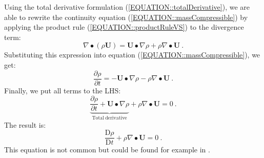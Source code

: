	Using the total derivative formulation (\ref{EQUATION::totalDerivative}),
    we are able to rewrite the continuity equation
    (\ref{EQUATION::massCompressible}) by applying the product rule
    (\ref{EQUATION::productRuleVS}) to the divergence term:
%
%
\begin{equation}
  \nabla \bullet \left(\rho \textbf{U}\right)
=
  \textbf{U} \bullet \nabla \rho + \rho \nabla \bullet \textbf{U} ~.
\end{equation}
%
%
	Substituting this expression into equation
    (\ref{EQUATION::massCompressible}), we get:
%
%
\begin{equation}
 \frac{\partial \rho}{\partial t}
 =
 -\textbf{U} \bullet \nabla \rho - \rho \nabla \bullet \textbf{U} ~.
\end{equation}
%
%
	Finally, we put all terms to the LHS:
%
%
\begin{equation}
 \underbrace{\frac{\partial \rho}{\partial t}
+
 \textbf{U} \bullet \nabla \rho}_{\mathrm{Total~derivative}}
+
 \rho \nabla \bullet \textbf{U}
 =
0 ~.
\end{equation}
%
%
	The result is:
%
%
\begin{equation}
 \frac{\mathrm{D} \rho}{\mathrm{D} t}
+
 \rho \nabla \bullet \textbf{U}
 =
0 ~.
\end{equation}
%
%
	This equation is not common but could be found for example in
    \cite{Anderson}.


